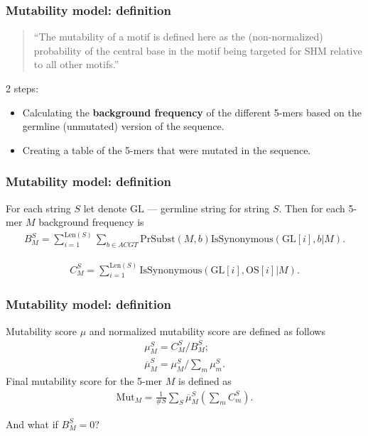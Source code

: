 \documentclass{beamer}\usepackage[]{graphicx}\usepackage[]{color}
\begin{document}
\begin{frame}
    \frametitle{Mutability model: definition}
    \begin{quote}
        ``The mutability of a motif is defined here as the (non-normalized)
        probability of the central base in the motif being targeted for SHM
        relative to all other motifs.''
    \end{quote}
    2 steps:
    \begin{itemize}
        \item  Calculating the \textbf{background frequency} of the
different 5-mers based on the germline (unmutated) version of the
sequence.
        \item  Creating a table of the 5-mers that were mutated
in the sequence.
    \end{itemize}
\end{frame}
\begin{frame}
    \frametitle{Mutability model: definition}
    For each string $S$ let denote $\mathrm {GL}$ --- germline string for string $S$.
    Then for each 5-mer $M$ background frequency is
    \begin{gather*}
        B^S_M = \sum_{i=1}^{\mathrm {Len}(S)} \sum_{b \in ACGT} \mathrm{PrSubst}(M, b) \mathrm{IsSynonymous}(\mathrm{GL}[i], b| M).
    \end{gather*}
    
    \begin{gather*}
        C^S_M = \sum_{i=1}^{\mathrm {Len}(S)} \mathrm{IsSynonymous}(\mathrm{GL}[i], \mathrm{OS}[i]| M).
    \end{gather*}
\end{frame}

\begin{frame}
    \frametitle{Mutability model: definition}
    Mutability score $\mu$ and normalized mutability score are defined as follows
    \begin{gather*}
        \mu^S_M = C^S_M / B^S_M;\\
        \overline \mu^S_M = \mu^S_M / \sum_m \mu^S_m.
    \end{gather*}
    Final mutability score for the 5-mer $M$ is defined as
    \begin{gather*}
        \mathrm{Mut}_M = \frac{1}{\#S} \sum_S \overline \mu^S_M \left(\sum_m C^S_m\right).
    \end{gather*}
    
    {\color{blue} And what if $B_M^S = 0$?}
\end{frame}
\end{document}
